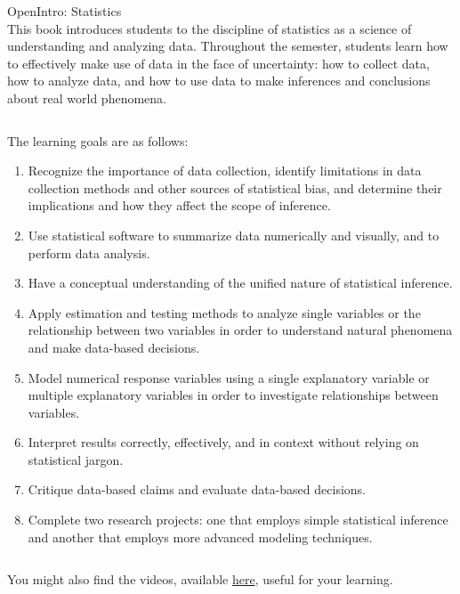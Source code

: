 \documentclass[11pt]{article}
\begin{document}
{\LARGE \textcolor{oiB}{OpenIntro: Statistics}} \\


This book introduces students to the discipline of statistics as a science of understanding and analyzing data. Throughout the semester, students learn how to effectively make use of data in the face of uncertainty: how to collect data, how to analyze data, and how to use data to make inferences and conclusions about real world phenomena.

$\:$

The learning goals are as follows:
 
\begin{enumerate}
\renewcommand\labelenumi{\textcolor{oiB}{\textbf{Goal \theenumi.}}}
\item Recognize the importance of data collection, identify limitations in data collection methods and other sources of statistical bias, and determine their implications and how they affect the scope of inference.
\item Use statistical software to summarize data numerically and visually, and to perform data analysis. 
\item Have a conceptual understanding of the unified nature of statistical inference.
\item Apply estimation and testing methods to analyze single variables or the relationship between two variables in order to understand natural phenomena and make data-based decisions.
\item Model numerical response variables using a single explanatory variable or multiple explanatory variables in order to investigate relationships between variables.
\item Interpret results correctly, effectively, and in context without relying on statistical jargon.
\item Critique data-based claims and evaluate data-based decisions.
\item Complete two research projects: one that employs simple statistical inference and another that employs more advanced modeling techniques.
\end{enumerate}

$\:$

You might also find the videos, available \href{https://www.openintro.org/stat/videos.php}{here}, useful for your learning.
\end{document}
